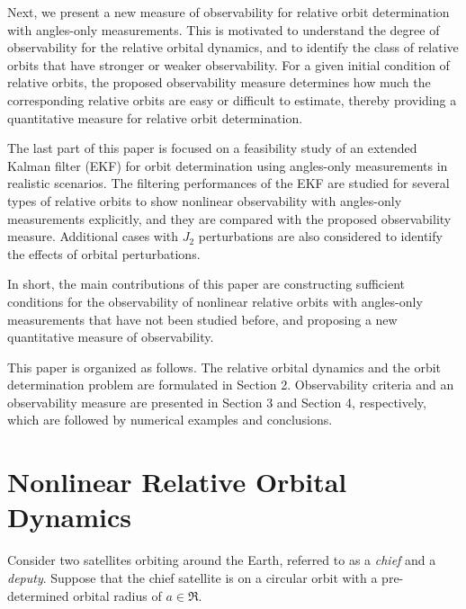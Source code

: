 Next, we present a new measure of observability for relative orbit determination with angles-only measurements. This is motivated to understand the degree of observability for the relative orbital dynamics, and to identify the class of relative orbits that have stronger or weaker observability. For a given initial condition of relative orbits, the proposed observability measure determines how much the corresponding relative orbits are easy or difficult to estimate, thereby providing a quantitative measure for relative orbit determination.

The last part of this paper is focused on a feasibility study of an extended Kalman filter (EKF) for orbit determination using angles-only measurements in realistic scenarios. The filtering performances of the EKF are studied for several types of relative orbits to show nonlinear observability with angles-only measurements explicitly, and they are compared with the proposed observability measure. Additional cases with $J_2$ perturbations are also considered to identify the effects of orbital perturbations. 

In short, the main contributions of this paper are constructing sufficient conditions for the observability of nonlinear relative orbits with angles-only measurements that have not been studied before, and proposing a new quantitative measure of observability. 

This paper is organized as follows. The relative orbital dynamics and the orbit determination problem are formulated in Section 2. Observability criteria and an observability measure are presented in Section 3 and Section 4, respectively, which are followed by numerical examples and conclusions.


\section{Nonlinear Relative Orbital Dynamics}\label{sec:ND}

Consider two satellites orbiting around the Earth, referred to as a \textit{chief} and a \textit{deputy}. Suppose that the chief satellite is on a circular orbit with a pre-determined orbital radius of $a\in\Re$.

